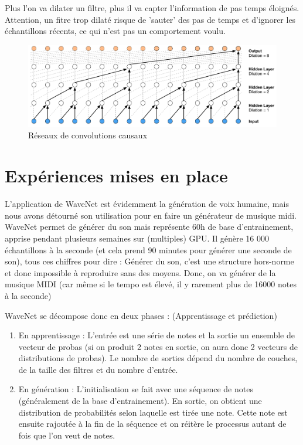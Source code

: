 \documentclass[a4paper]{article}
\begin{document}
Plus l'on va dilater un filtre, plus il va capter l'information de pas temps éloignés. Attention, un fitre trop dilaté risque de 'sauter' des pas de temps et d'ignorer les échantillons récents, ce qui n'est pas un comportement voulu.

\begin{figure}[h]
  \includegraphics[scale=0.2]{modelDilate.png}
  \caption{\label{fig:modelDilate} Réseaux de convolutions causaux}
\end{figure}

\section{Expériences mises en place}

L'application de WaveNet est évidemment la génération de voix humaine, mais nous avons détourné son utilisation pour en faire un générateur de musique midi. WaveNet permet de générer du son mais représente 60h de base d'entrainement, apprise pendant plusieurs semaines sur (multiples) GPU. Il génère 16 000 échantillons à la seconde (et cela prend 90 minutes pour générer une seconde de son), tous ces chiffres pour dire : Générer du son, c'est une structure hors-norme et donc impossible à reproduire sans des moyens. Donc, on va générer de la musique MIDI (car même si le tempo est élevé, il y rarement plus de 16000 notes à la seconde)

WaveNet se décompose donc en deux phases : (Apprentissage et prédiction)
\begin{enumerate}
\item En apprentissage : L'entrée est une série de notes et la sortie un ensemble de vecteur de probas (si on produit 2 notes en sortie, on aura donc 2 vecteurs de distributions de probas). Le nombre de sorties dépend du nombre de couches, de la taille des filtres et du nombre d'entrée. 

\item En génération : L'initialisation se fait avec une séquence de notes (généralement de la base d'entrainement). En sortie, on obtient une distribution de probabilités selon laquelle est tirée une note. Cette note est ensuite rajoutée à la fin de la séquence et on réitère le processus autant de fois que l'on veut de notes.
\end{enumerate}
\end{document}
